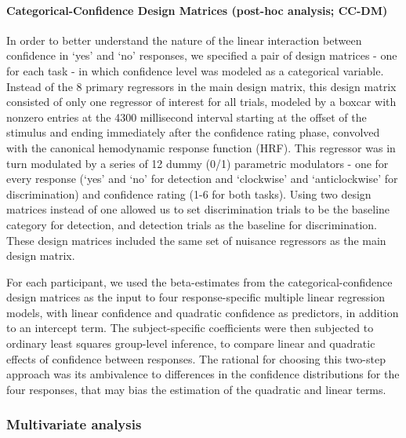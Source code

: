 \documentclass[12pt,twoside]{reedthesis}
\begin{document}
\hypertarget{categoricalDM}{%
\paragraph{Categorical-Confidence Design Matrices (post-hoc analysis; CC-DM)}\label{categoricalDM}}

In order to better understand the nature of the linear interaction between confidence in `yes' and `no' responses, we specified a pair of design matrices - one for each task - in which confidence level was modeled as a categorical variable. Instead of the 8 primary regressors in the main design matrix, this design matrix consisted of only one regressor of interest for all trials, modeled by a boxcar with nonzero entries at the 4300 millisecond interval starting at the offset of the stimulus and ending immediately after the confidence rating phase, convolved with the canonical hemodynamic response function (HRF). This regressor was in turn modulated by a series of 12 dummy (0/1) parametric modulators - one for every response (`yes' and `no' for detection and `clockwise' and `anticlockwise' for discrimination) and confidence rating (1-6 for both tasks). Using two design matrices instead of one allowed us to set discrimination trials to be the baseline category for detection, and detection trials as the baseline for discrimination. These design matrices included the same set of nuisance regressors as the main design matrix.

For each participant, we used the beta-estimates from the categorical-confidence design matrices as the input to four response-specific multiple linear regression models, with linear confidence and quadratic confidence as predictors, in addition to an intercept term. The subject-specific coefficients were then subjected to ordinary least squares group-level inference, to compare linear and quadratic effects of confidence between responses. The rational for choosing this two-step approach was its ambivalence to differences in the confidence distributions for the four responses, that may bias the estimation of the quadratic and linear terms.

\hypertarget{multivariate-analysis}{%
\subsubsection*{Multivariate analysis}\label{multivariate-analysis}}
\end{document}

